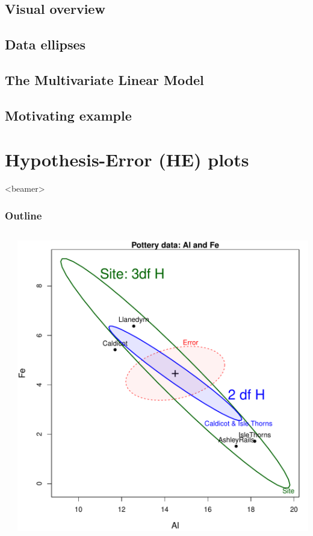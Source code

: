 \documentclass[10pt,t]{beamer}
\begin{document}
\subsection{Visual overview}



\subsection{Data ellipses}

%
\subsection{The Multivariate Linear Model}

%
\subsection{Motivating example}


\section{Hypothesis-Error (HE) plots}
\begin{frame}<beamer>
  \frametitle{Outline}
	\begin{columns}[c]
	  \begin{column}{.6\textwidth}
	  \end{column}
	  \begin{column}{.4\textwidth}
	  \includegraphics[width=\textwidth]{figures/pottery-HE2b}
	  \end{column}
	\end{columns}
\end{frame}
\end{document}
